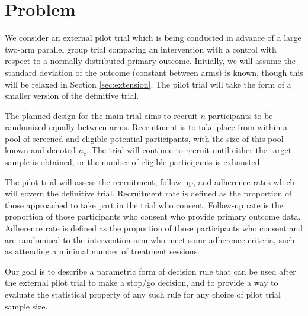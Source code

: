 \documentclass[AMA,STIX1COL]{WileyNJD-v2}
\begin{document}



\section{Problem}\label{sec:problem}

We consider an external pilot trial which is being conducted in advance of a large two-arm parallel group trial comparing an intervention with a control with respect to a normally distributed primary outcome. Initially, we will assume the standard deviation of the outcome (constant between arms) is known, though this will be relaxed in Section \ref{sec:extension}. The pilot trial will take the form of a smaller version of the definitive trial. 

The planned design for the main trial aims to recruit $n$ participants to be randomised equally between arms. Recruitment is to take place from within a pool of screened and eligible potential participants, with the size of this pool known and denoted $n_e$. The trial will continue to recruit until either the target sample is obtained, or the number of eligible participants is exhausted.

The pilot trial will assess the recruitment, follow-up, and adherence rates which will govern the definitive trial. Recruitment rate is defined as the proportion of those approached to take part in the trial who consent. Follow-up rate is the proportion of those participants who consent who provide primary outcome data. Adherence rate is defined as the proportion of those participants who consent and are randomised to the intervention arm who meet some adherence criteria, such as attending a minimal number of treatment sessions. 

Our goal is to describe a parametric form of decision rule that can be used after the external pilot trial to make a stop/go decision, and to provide a way to evaluate the statistical property of any such rule for any choice of pilot trial sample size.
\end{document}
